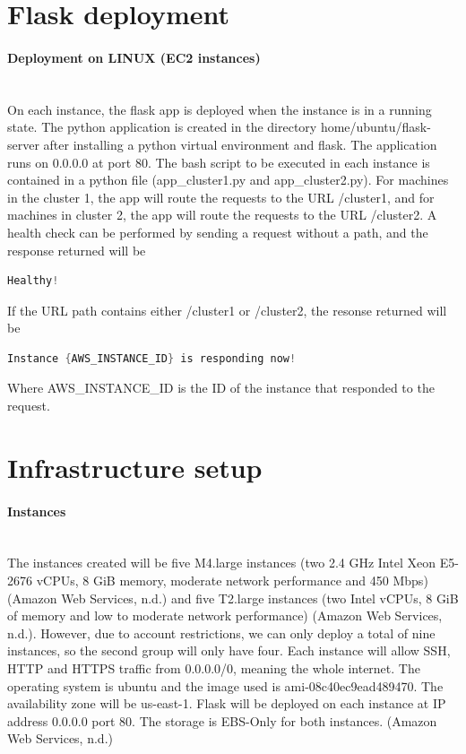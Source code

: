 \documentclass[11pt]{article}
\title{}
\author{}
\date{}
\begin{document}
\maketitle
\section{Flask deployment}

\paragraph{Deployment on LINUX (EC2 instances)}\mbox{}\\
On each instance, the flask app is deployed when the instance is in a running state. The python application is created in the directory home/ubuntu/flask-server after installing a python virtual environment and flask. The application runs on 0.0.0.0 at port 80. The bash script to be executed in each instance is contained in a python file (app\_cluster1.py and app\_cluster2.py). For machines in the cluster 1, the app will route the requests to the URL /cluster1, and for machines in cluster 2, the app will route the requests to the URL /cluster2. A health check can be performed by sending a request without a path, and the response returned will be
\begin{lstlisting}[language=C]
Healthy!
\end{lstlisting}
If the URL path contains either /cluster1 or /cluster2, the resonse returned will be
\begin{lstlisting}[language=C]
Instance {AWS_INSTANCE_ID} is responding now!
\end{lstlisting}
Where AWS\_INSTANCE\_ID is the ID of the instance that responded to the request.

\section{Infrastructure setup}

\paragraph{Instances}\mbox{}\\
The instances created will be five M4.large instances (two 2.4 GHz Intel Xeon E5-2676 vCPUs, 8 GiB memory, moderate network performance and 450 Mbps) (Amazon Web Services, n.d.) and five T2.large instances (two Intel vCPUs, 8 GiB of memory and low to moderate network performance)  (Amazon Web Services, n.d.). However, due to account restrictions, we can only deploy a total of nine instances, so the second group will only have four. Each instance will allow SSH, HTTP and HTTPS traffic from 0.0.0.0/0, meaning the whole internet. The operating system is ubuntu and the image used is ami-08c40ec9ead489470. The availability zone will be us-east-1. Flask will be deployed on each instance at IP address 0.0.0.0 port 80. The storage is EBS-Only for both instances.  (Amazon Web Services, n.d.)
\end{document}
